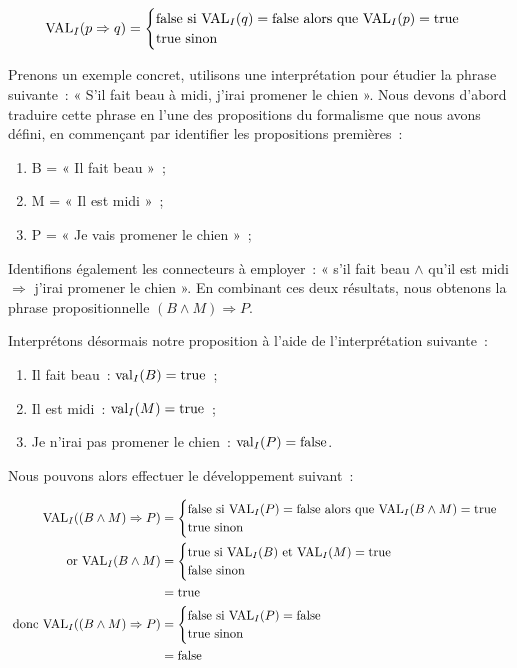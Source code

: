 \[\mathrm{VAL}_I(p \Rightarrow q) = \begin{cases}
  \mathrm{false} \mbox{ si } \mathrm{VAL}_I(q) = \mathrm{false} \mbox{ alors que } \mathrm{VAL}_I(p) = \mathrm{true} \\
  \mathrm{true}\mbox{ sinon}
\end{cases}\]

Prenons un exemple concret, utilisons une interprétation pour étudier la phrase
suivante~: « S'il fait beau à midi, j'irai promener le chien ». Nous devons
d’abord traduire cette phrase en l’une des propositions du formalisme que nous
avons défini, en commençant par identifier les propositions premières~:

\begin{enumerate}
\item B = « Il fait beau »~;
\item M = « Il est midi »~;
\item P = « Je vais promener le chien »~;
\end{enumerate}

Identifions également les connecteurs à employer~: « s’il fait beau $\land$
  qu'il est midi $\Rightarrow$ j’irai promener le chien ». En combinant ces deux
résultats, nous obtenons la phrase propositionnelle $(B \land M) \Rightarrow P$.

Interprétons désormais notre proposition à l’aide de l’interprétation suivante~:
\begin{enumerate}
  \item Il fait beau~: $\mathrm{val}_I(B) = \mathrm{true}$~;
  \item Il est midi~: $\mathrm{val}_I(M) = \mathrm{true}$~;
  \item Je n’irai pas promener le chien~: $\mathrm{val}_I(P) = \mathrm{false}$.
\end{enumerate}

Nous pouvons alors effectuer le développement suivant~:

\begin{align*}
  \mathrm{VAL}_I((B \land M) \Rightarrow P) &= \begin{cases}
    \mathrm{false} \mbox{ si } \mathrm{VAL}_I(P) = \mathrm{false} \mbox{ alors que } \mathrm{VAL}_I(B \land M) = \mathrm{true} \\
    \mathrm{true}\mbox{ sinon}
  \end{cases} \\
  \mbox{ or }\mathrm{VAL}_I(B \land M) &= \begin{cases}
    \mathrm{true} \mbox{ si } \mathrm{VAL}_I(B) \mbox{ et } \mathrm{VAL}_I(M) = \mathrm{true} \\
    \mathrm{false}\mbox{ sinon}
  \end{cases} \\
  &= \mathrm{true} \\
  \mbox{ donc }  \mathrm{VAL}_I((B \land M) \Rightarrow P) &= \begin{cases}
    \mathrm{false} \mbox{ si } \mathrm{VAL}_I(P) = \mathrm{false} \\
    \mathrm{true}\mbox{ sinon}
  \end{cases} \\
  &= \mathrm{false}
\end{align*}

